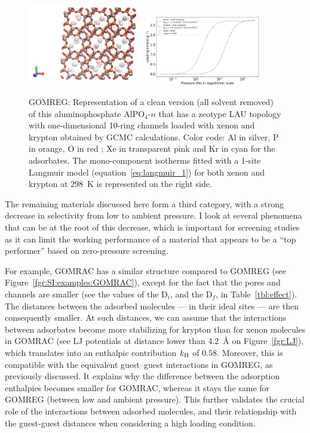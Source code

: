 \documentclass[main.tex]{subfiles}
\begin{document}
\begin{figure}[ht]
  \centering
    \includegraphics[width=0.45\textwidth]{figures/2-thermo/GOMREG_clean.jpg}
    \includegraphics[width=0.45\textwidth]{figures/2-thermo/GOMREG_clean_isotherm_xenon_krypton_298K.jpg}
    \caption{GOMREG: Representation of a clean version (all solvent removed) of this aluminophosphate AlPO$_4$-$n$ that has a zeotype LAU topology with one-dimensional 10-ring channels loaded with xenon and krypton obtained by GCMC calculations. Color code: Al in silver, P in orange, O in red ; Xe in transparent pink and Kr in cyan for the adsorbates. The mono-component isotherms fitted with a 1-site Langmuir model (equation~\ref{eq:langmuir_1}) for both xenon and krypton at \SI{298}{\kelvin} is represented on the right side.}\label{fgr:SI:examples:GOMREG}
  \end{figure}

The remaining materials discussed here form a third category, with a strong decrease in selectivity from low to ambient pressure. I look at several phenomena that can be at the root of this decrease, which is important for screening studies as it can limit the working performance of a material that appears to be a ``top performer'' based on zero-pressure screening.


For example, GOMRAC has a similar structure compared to GOMREG (see Figure~\ref{fgr:SI:examples:GOMRAC}), except for the fact that the pores and channels are smaller (see the values of the D$_i$, and the D$_f$, in Table~\ref{tbl:effect}). The distances between the adsorbed molecules --- in their ideal sites --- are then consequently smaller. At such distances, we can assume that the interactions between adsorbates become more stabilizing for krypton than for xenon molecules in GOMRAC (see LJ potentials at distance lower than \SI{4.2}{\angstrom} on Figure~\ref{fgr:LJ}), which translates into an enthalpic contribution $k_{\text{H}}$ of $0.58$. Moreover, this is compatible with the equivalent guest--guest interactions in GOMREG, as previously discussed. It explains why the difference between the adsorption enthalpies becomes smaller for GOMRAC, whereas it stays the same for GOMREG (between low and ambient pressure). This further validates the crucial role of the interactions between adsorbed molecules, and their relationship with the guest-guest distances when considering a high loading condition.
\end{document}
